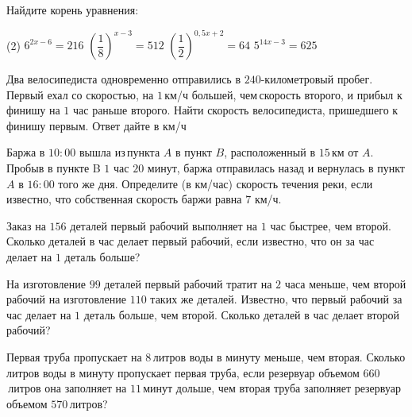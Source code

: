 \begin{homework}[number=2]
	\begin{listofex}
		\item Найдите корень уравнения:
		\begin{tasks}(2)
			\task \( 6^{2x-6}=216 \)
			\task \( \left( \dfrac{ 1 }{ 8 } \right)^{x-3}=512 \)
			\task \( \left( \dfrac{ 1 }{ 2 } \right)^{0,5x+2}=64 \)
			\task \( 5^{14x-3}=625 \)
		\end{tasks}
		\item Два велосипедиста одновременно отправились в \(240\)-километровый пробег. Первый ехал со скоростью, на \(1\) км/ч большей, чем скорость второго, и прибыл к финишу на \(1\) час раньше второго. Найти скорость велосипедиста, пришедшего к финишу первым. Ответ дайте в км/ч
		\item Баржа в \(10:00\) вышла из пункта \(A\) в пункт \(B\), расположенный в \(15\) км от \(A\). Пробыв в пункте B \(1\) час \(20\) минут, баржа отправилась назад и вернулась в пункт \(A\) в \(16:00\) того же дня. Определите (в км/час) скорость течения реки, если известно, что собственная скорость баржи равна \(7\) км/ч.
		\item Заказ на \(156\) деталей первый рабочий выполняет на \(1\) час быстрее, чем второй. Сколько деталей в час делает первый рабочий, если известно, что он за час делает на \(1\) деталь больше?
		\item На изготовление \(99\) деталей первый рабочий тратит на \(2\) часа меньше, чем второй рабочий на изготовление \(110\) таких же деталей. Известно, что первый рабочий за час делает на \(1\) деталь больше, чем второй. Сколько деталей в час делает второй рабочий?
		\item Первая труба пропускает на \(8\) литров воды в минуту меньше, чем вторая. Сколько литров воды в минуту пропускает первая труба, если резервуар объемом \(660\) литров она заполняет на \(11\) минут дольше, чем вторая труба заполняет резервуар объемом \(570\) литров?
	\end{listofex}
\end{homework}

